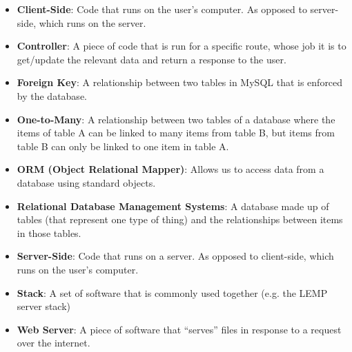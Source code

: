 \begin{itemize}[leftmargin=*]
    \item
        \textbf{Client-Side}:
        Code that runs on the user's computer. As opposed to server-side, which runs on the server.
    \item
        \textbf{Controller}:
        A piece of code that is run for a specific route, whose job it is to get/update the relevant data and return a response to the user.
    \item
        \textbf{Foreign Key}:
        A relationship between two tables in MySQL that is enforced by the database.
    \item
        \textbf{One-to-Many}:
        A relationship between two tables of a database where the items of table A can be linked to many items from table B, but items from table B can only be linked to one item in table A.
    \item
        \textbf{ORM (Object Relational Mapper)}:
        Allows us to access data from a database using standard objects.
    \item
        \textbf{Relational Database Management Systems}:
        A database made up of tables (that represent one type of thing) and the relationships between items in those tables.
    \item
        \textbf{Server-Side}:
        Code that runs on a server. As opposed to client-side, which runs on the user's computer.
    \item
        \textbf{Stack}:
        A set of software that is commonly used together (e.g. the LEMP server stack)
    \item
        \textbf{Web Server}:
        A piece of software that ``serves'' files in response to a request over the internet.
\end{itemize}

